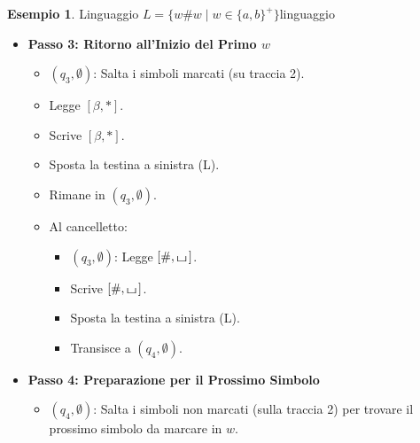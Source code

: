 \documentclass[a4paper]{article}
\theoremstyle{definition} %
\newtheorem{example}{Esempio}
\newcommand{\blankS}{\ensuremath{\raisebox{-0.15ex}{\scalebox{1.3}[0.7]{$\sqcup$}}\mkern2mu}}
\begin{document}
\begin{example}{Linguaggio $L = \{w\#w \mid w \in \{a,b\}^+\}$}{linguaggio}
\begin{itemize}
\begin{itemize}
            \item Scrive $[\beta, *]$.
            \item Sposta la testina a destra (R).
            \item Rimane in $(q_2, \alpha)$.
            \item Quando trova il simbolo corrispondente a $\alpha$:
                \begin{itemize}
                    \item $(q_2, \alpha)$: Legge $[\alpha, \blankS]$.
                    \item Scrive $[\alpha, *]$.
                    \item Sposta la testina a sinistra (L).
                    \item Transisce a $(q_3, \emptyset)$ (non serve più memorizzare $\alpha$).
                \end{itemize}
        \end{itemize}
    \item \textbf{Passo 3: Ritorno all'Inizio del Primo $w$}
        \begin{itemize}
            \item $(q_3, \emptyset)$: Salta i simboli marcati (su traccia 2).
            \item Legge $[\beta, *]$.
            \item Scrive $[\beta, *]$.
            \item Sposta la testina a sinistra (L).
            \item Rimane in $(q_3, \emptyset)$.
            \item Al cancelletto:
                \begin{itemize}
                    \item $(q_3, \emptyset)$: Legge $[\#, \blankS]$.
                    \item Scrive $[\#, \blankS]$.
                    \item Sposta la testina a sinistra (L).
                    \item Transisce a $(q_4, \emptyset)$.
                \end{itemize}
        \end{itemize}
    \item \textbf{Passo 4: Preparazione per il Prossimo Simbolo}
        \begin{itemize}
            \item $(q_4, \emptyset)$: Salta i simboli non marcati (sulla traccia 2) per trovare il prossimo simbolo da marcare in $w$.

\end{itemize}
\end{itemize}
\end{example}
\end{document}
